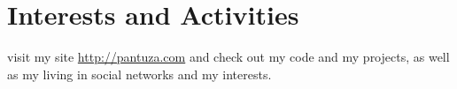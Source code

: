 \documentclass[a4paper,10pt]{article} %
\begin{document}

\section{Interests and Activities}
visit my site \href{http://pantuza.com}{http://pantuza.com} and check 
out my code and my projects, as well as my living in
social networks and my interests.

\end{document}
